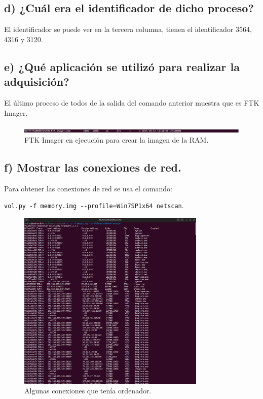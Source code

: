 \documentclass{article}
\begin{document}
\subsection{d) ¿Cuál era el identificador de dicho proceso?}

El identificador se puede ver en la tercera columna, tienen el identificador 3564, 4316 y 3120.
\subsection{e) ¿Qué aplicación se utilizó para realizar la adquisición?}
El último proceso de todos de la salida del comando anterior muestra que es FTK Imager.

\begin{figure}[H]
    \centering
    \includegraphics[width=\textwidth]{imagenes/pslist-2.png}
    \caption{FTK Imager en ejecución para crear la imagen de la RAM.}
\end{figure}
\subsection{f) Mostrar las conexiones de red.}
Para obtener las conexiones de red se usa el comando:

\verb|vol.py -f memory.img --profile=Win7SP1x64 netscan|.

\begin{figure}[H]
    \centering
    \includegraphics[width=0.8\textwidth]{imagenes/netscan.png}
    \caption{Algunas conexiones que tenía ordenador.}
\end{figure}
\end{document}
